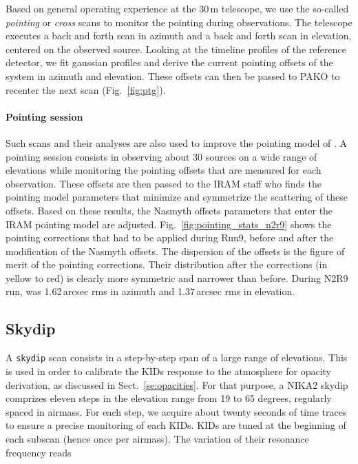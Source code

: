 Based on general operating experience at the 30\,m telescope, we use the so-called
{\em pointing} or {\em cross} scans to monitor the pointing during observations. The
telescope executes a back and forth scan in azimuth and a back and forth scan in
elevation, centered on the observed source. Looking at the timeline profiles of
the reference detector, we fit gaussian profiles and derive the current pointing
offsets of the system in azimuth and elevation. These offsets can then be passed
to PAKO to recenter the next scan (Fig.~\ref{fig:ptg}).

\paragraph{Pointing session}
\label{se:pointing_session}

Such scans and their analyses are also used to improve the pointing model of
\nika. A pointing session consists in observing about 30 sources on a wide range
of elevations  while monitoring the pointing offsets
that are measured for each observation. These offsets are then passed to the
IRAM staff who finds the pointing model parameters that minimize and symmetrize
the scattering of these offsets. Based on these results, the Nasmyth offsets
parameters that enter the IRAM pointing model are
adjusted. Fig.~\ref{fig:pointing_stats_n2r9} shows the pointing corrections that
had to be applied during Run9, before and after the modification of the Nasmyth
offsets. The dispersion of the offsets is the figure of merit of the pointing
corrections. Their distribution after the corrections (in yellow to red) is
clearly more symmetric and narrower than before. During N2R9 run,  was 1.62\,arcsec rms in azimuth and 1.37\,arcsec rms in elevation.

\subsection{Skydip}
\label{se:skydip}

A {\tt skydip} scan  consists in a step-by-step span
of a large range of elevations. This is used in order to calibrate the
KIDs response to the atmosphere for opacity derivation, as discussed in
Sect.~\ref{se:opacities}.
For that purpose, a NIKA2 skydip comprizes eleven steps in
the elevation range from 19 to 65 degrees, regularly spaced in
airmass. For each step, we acquire about twenty seconds of time traces
to ensure a precise monitoring of each KIDs. KIDs are tuned at the beginning of
each subscan (hence once per airmass). The variation of their resonance
frequency reads

